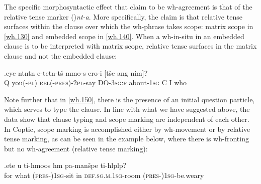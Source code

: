 \documentclass{glossa}
\begin{document}
The specific morphosyntactic effect that \cite{rlc:2006} claim to be wh-agreement is that of the relative tense marker (\textschwa)\textit{nt-a}. More specifically, the claim is that relative tense surfaces within the clause over which the wh-phrase takes scope: matrix scope in \ref{wh.130} and embedded scope in \ref{wh.140}. When a wh-in-situ in an embedded clause is to be interpreted with matrix scope, relative tense surfaces in the matrix clause and not the embedded clause:

\exg.\label{wh.150}eye {\textschwa}nt{\textopeno}nt{\textschwa}n e-tet{\textschwa}n-t\v{s}{\textopeno} {\textschwa}mmo-s ero-i [t\v{s}e ang nim]?\\
   Q you(\textsc{-pl}) \textsc{rel(-pres)-2pl}-say DO-\textsc{3sg:f} about-\textsc{1sg} C I who\\

Note further that in \ref{wh.150}, there is the presence of an initial question particle, which serves to type the clause. In line with what we have suggested above, the data show that clause typing and scope marking are independent of each other. In Coptic, scope marking is accomplished either by wh-movement or by relative tense marking, as can be seen in the example below, where there is wh-fronting but no wh-agreement (relative tense marking):

%
%

\exg.\label{wh.160}et{\textbeta}e u ti-hmoos h{\textschwa}m pa-man\v{s}{\textopeno}pe ti-hl{\textschwa}pl{\textopeno}p?\\
   for what (\textsc{pres-})\textsc{1sg}-sit in \textsc{def.sg.m.1sg}-room (\textsc{pres-})\textsc{1sg}-be.weary\\
\end{document}

